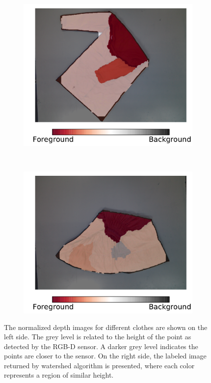 \begin{figure}[htbp]
\begin{subfigure}[l]{0.49\textwidth}
	    \centering
    	\includegraphics[width=\textwidth]
    	{figures/clustering/robe19-clustering.pdf}
	\end{subfigure}
	~
    \begin{subfigure}[r]{0.49\textwidth}
	    \centering
    	\includegraphics[width=\textwidth]
    	{figures/clustering/skirt17-clustering.pdf}
	\end{subfigure} 
    \caption[The normalized depth images for different clothes are shown on the left side.]
    {The normalized depth images for different clothes are shown on the left side. The grey level is related to the height of the point as detected by the RGB-D sensor. A darker grey level indicates the points are closer to the sensor. On the right side, the labeled image returned by watershed algorithm is presented, where each color represents a region of similar height.}
    \label{fig:watershed_labels}
\end{figure}
